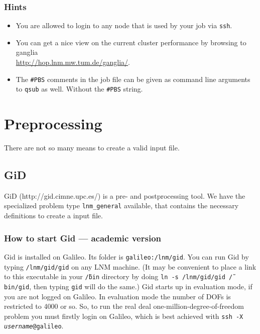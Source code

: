 \subsubsection{Hints}

\begin{itemize}
\item You are allowed to login to any node that is used by your job via
\texttt{ssh}.
\item You can get a nice view on the current cluster performance by browsing
to ganglia\\
\url{http://hop.lnm.mw.tum.de/ganglia/}.
\item The \texttt{\#PBS} comments in the job file can be given as command
line arguments to \texttt{qsub} as well. Without the \texttt{\#PBS}
string.
\end{itemize}

\section{Preprocessing}

There are not so many means to create a valid input file.


\subsection{GiD}\label{beginner:sec:gid}

GiD (http://gid.cimne.upc.es/) is a pre- and postprocessing tool. We have the specialized problem
type \texttt{lnm\_general} available, that contains the necessary
definitions to create a \ccarat{} input file.

\subsubsection{How to start Gid --- academic version}

Gid is installed on Galileo. Its folder is \texttt{galileo:/lnm/gid}.
You can run Gid by typing \texttt{/lnm/gid/gid} on any LNM machine.
(It may be convenient to place a link to this executable in your \texttt{\~{/}bin}
directory by doing \texttt{ln -s /lnm/gid/gid \~{/}bin/gid}, then
typing \texttt{gid} will do the same.) Gid starts up in evaluation
mode, if you are not logged on Galileo. In evaluation mode the number
of DOFs is restricted to 4000 or so. So, to run the real deal one-million-degree-of-freedom
problem you must firstly login on Galileo, which is best achieved
with \texttt{ssh -X} \texttt{\emph{username}}\texttt{@galileo}.

